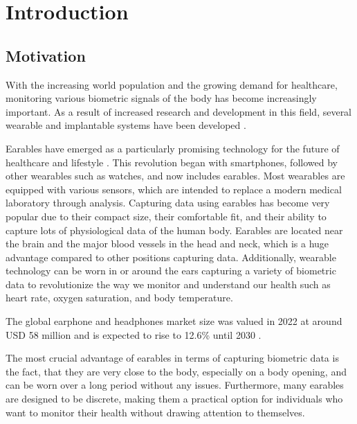 
\chapter{Introduction}
\label{ch:Introduction}

\section{Motivation}
With the increasing world population and the growing demand for healthcare, monitoring various biometric signals of the body has become increasingly important. As a result of increased research and development in this field, several wearable and implantable systems have been developed \cite{loncar-turukaloLiteratureWearableTechnology2019}.

Earables have emerged as a particularly promising technology for the future of healthcare and lifestyle \cite{trespGoingDigitalSurvey2016, kirkWearablesRevolutionStandardization2014a}. This revolution began with smartphones, followed by other wearables such as watches, and now includes earables. Most wearables are equipped with various sensors, which are intended to replace a modern medical laboratory through analysis.
Capturing data using earables has become very popular due to their compact size, their comfortable fit, and their ability to capture lots of physiological data of the human body. 
Earables are located near the brain and the major blood vessels in the head and neck, which is a huge advantage compared to other positions capturing data.
Additionally, wearable technology can be worn in or around the ears capturing a variety of biometric data to revolutionize the way we monitor and understand our health such as heart rate, oxygen saturation, and body temperature.

The global earphone and headphones market size was valued in 2022 at around USD 58 million and is expected to rise to 12.6\% until 2030 \cite{GlobalEarphonesHeadphones}.

The most crucial advantage of earables in terms of capturing biometric data is the fact, that they are very close to the body, especially on a body opening, and can be worn over a long period without any issues. 
Furthermore, many earables are designed to be discrete, making them a practical option for individuals who want to monitor their health without drawing attention to themselves.

